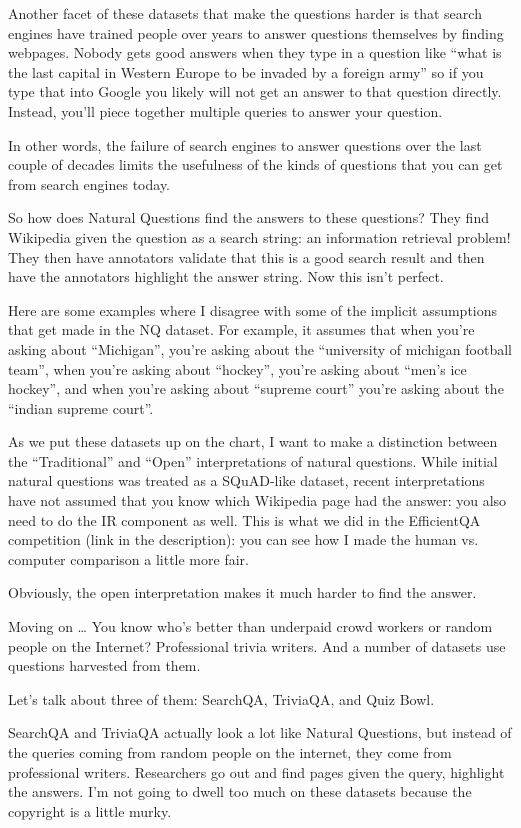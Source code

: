 Another facet of these datasets that make the questions harder is that search engines have trained people over years to answer questions themselves by finding webpages.  Nobody gets good answers when they type in a question like “what is the last capital in Western Europe to be invaded by a foreign army” so if you type that into Google you likely will not get an answer to that question directly.  Instead, you’ll piece together multiple queries to answer your question.

In other words, the failure of search engines to answer questions over the last couple of decades limits the usefulness of the kinds of questions that you can get from search engines today.  

So how does Natural Questions find the answers to these questions?  They find Wikipedia given the question as a search string: an information retrieval problem!  They then have annotators validate that this is a good search result and then have the annotators highlight the answer string.  Now this isn’t perfect.  

Here are some examples where I disagree with some of the implicit assumptions that get made in the NQ dataset.  For example, it assumes that when you’re asking about “Michigan”, you’re asking about the “university of michigan football team”, when you’re asking about “hockey”, you’re asking about “men’s ice hockey”, and when you’re asking about “supreme court” you’re asking about the “indian supreme court”.  

As we put these datasets up on the chart, I want to make a distinction between the “Traditional” and “Open” interpretations of natural questions.  While initial natural questions was treated as a SQuAD-like dataset, recent interpretations have not assumed that you know which Wikipedia page had the answer: you also need to do the IR component as well.  This is what we did in the EfficientQA competition (link in the description): you can see how I made the human vs. computer comparison a little more fair.

Obviously, the open interpretation makes it much harder to find the answer.


Moving on … You know who’s better than underpaid crowd workers or random people on the Internet?  Professional trivia writers.  And a number of datasets use questions harvested from them.

Let’s talk about three of them: SearchQA, TriviaQA, and Quiz Bowl.

SearchQA and TriviaQA actually look a lot like Natural Questions, but instead of the queries coming from random people on the internet, they come from professional writers.  Researchers go out and find pages given the query, highlight the answers.  I’m not going to dwell too much on these datasets because the copyright is a little murky.

